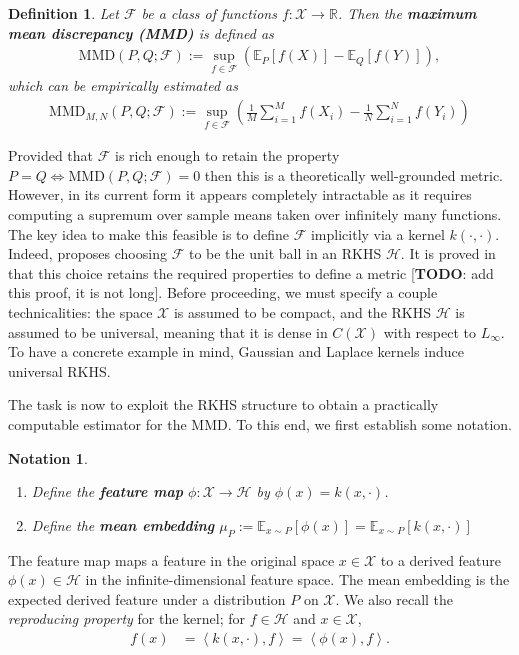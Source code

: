 \documentclass[12pt]{article}
\newcommand{\E}{\mathbb{E}}
\newcommand{\R}{\mathbb{R}}
\newcommand{\featureMap}{\phi}
\newcommand{\RKHS}{\mathcal{H}}
\newcommand{\Ker}{k}
\newcommand{\dataSpace}{\mathcal{X}}
\newcommand{\meanEmb}[1]{\mu_{#1}}
\newcommand{\MMD}{\text{MMD}}
\newcommand{\MMDSpace}{\mathcal{F}}
\newtheorem{definition}{Definition}
\newtheorem{notation}{Notation}
\begin{document}
\begin{definition}
Let $\mathcal{F}$ be a class of functions $f: \mathcal{X} \to \R$. Then the \textbf{maximum mean discrepancy (MMD)} is defined as 
\begin{align}
\MMD(P, Q; \MMDSpace) := \sup_{f \in \mathcal{F}} \left(\E_P[f(X)] - \E_Q[f(Y)]\right),
\end{align}
which can be empirically estimated as 
\begin{align}
\MMD_{M,N}(P, Q; \MMDSpace) := \sup_{f \in \mathcal{F}} \left(\frac{1}{M} \sum_{i = 1}^{M} f(X_i) - \frac{1}{N} \sum_{i = 1}^{N} f(Y_i)\right)
\end{align}
\end{definition}

Provided that $\mathcal{F}$ is rich enough to retain the property $P = Q \iff \MMD(P, Q; \MMDSpace) = 0$ then this is a theoretically well-grounded metric. However, in its current form 
it appears completely intractable as it requires computing a supremum over sample means taken over infinitely many functions. The key idea to make this 
feasible is to define $\mathcal{F}$ implicitly via a kernel $k(\cdot, \cdot)$. Indeed, \cite{Gretton1} proposes choosing $\mathcal{F}$ to be the unit ball in an RKHS 
$\mathcal{H}$. It is proved in \cite{Gretton2} that this choice retains the required properties to define a metric [\textbf{TODO}: add this proof, it is not long]. 
Before proceeding, we must specify a couple technicalities: the space $\mathcal{X}$ is assumed to be compact, and 
the RKHS $\mathcal{H}$ is assumed to be universal, meaning that it is dense in $C(\mathcal{X})$ with respect to $L_\infty$. To have a concrete example in mind,
Gaussian and Laplace kernels induce universal RKHS. 

The task is now to exploit the RKHS structure to obtain a practically computable estimator for the MMD. To this end, we first establish some notation. 
\begin{notation}
\begin{enumerate}
Let $\Ker(\cdot, \cdot)$ be a kernel with associated RKHS $\RKHS$.
	\item Define the \textbf{feature map} $\featureMap: \dataSpace \to \RKHS$ by $\featureMap(x) = \Ker(x, \cdot)$. 
	\item Define the \textbf{mean embedding} $\meanEmb{P} := \E_{x \sim P}\left[\featureMap(x) \right] = \E_{x \sim P}\left[\Ker(x, \cdot) \right] $
\end{enumerate}
\end{notation}
The feature map maps a feature in the original space $x \in \dataSpace$ to a derived feature $\featureMap(x) \in \RKHS$ in the infinite-dimensional feature space. 
The mean embedding is the expected derived feature under a distribution $P$ on $\dataSpace$. We also recall the \textit{reproducing property} for the kernel; for 
$f \in \RKHS$ and $x \in \dataSpace$, 
\begin{align}
f(x) &= \left\langle \Ker(x, \cdot), f \right\rangle = \left\langle \featureMap(x), f \right\rangle.
\end{align}
\end{document}
